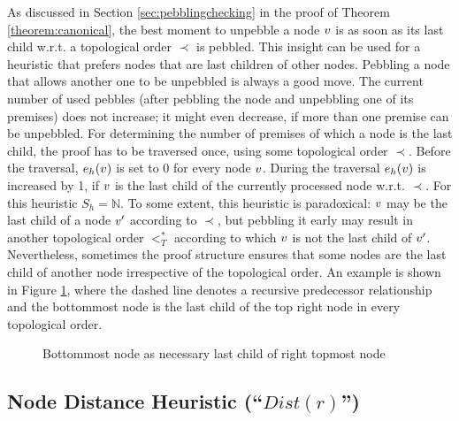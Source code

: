 \documentclass{llncs}
\begin{document}
As discussed in Section \ref{sec:pebblingchecking} in the proof of Theorem \ref{theorem:canonical}, the best moment to unpebble a node $v$ is as soon as its last child w.r.t. a topological order $\prec$ is pebbled. 
This insight can be used for a heuristic that prefers nodes that are last children of other nodes. Pebbling a node that allows another one to be unpebbled is always a good move. 
The current number of used pebbles (after pebbling the node and unpebbling one of its premises) does not increase; 
it might even decrease, if more than one premise can be unpebbled.
For determining the number of premises of which a node is the last child, the proof has to be traversed once, using some topological order $\prec$.
Before the traversal, $e_h(v)$ is set to 0 for every node $v$. During the traversal $e_h(v)$ is increased by 1, if $v$ is the last child of the currently processed node w.r.t. $\prec$. For this heuristic $S_h = \mathbb{N}$.
To some extent, this heuristic is paradoxical: $v$ may be the last child of a node $v'$ according to $\prec$, but pebbling it early may result in another topological order $<^*_T$ according to which $v$ is not the last child of $v'$.
Nevertheless, sometimes the proof structure ensures that some nodes are the last child of another node irrespective of the topological order. An example is shown in Figure \ref{fig:forcedLC}, where the dashed line denotes a recursive predecessor relationship and the bottommost node is the last child of the top right node in every topological order.

\begin{figure}[h]
	\caption{Bottommost node as necessary last child of right topmost node}
	\label{fig:forcedLC}
\end{figure}


\subsection{Node Distance Heuristic (``$Dist(r)$'')}
\label{sec:distance}
\end{document}

